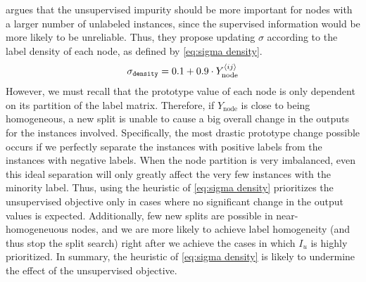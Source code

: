 

 argues that the unsupervised impurity should be more important for nodes with a larger number of unlabeled instances, since the supervised information would be more likely to be unreliable. Thus, they propose updating $\sigma$ according to the label density of each node, as defined by \autoref{eq:sigma density}.
%
\begin{equation}
    \sigma_\texttt{density} = 0.1 + 0.9 \cdot Y_\text{node}^{\langle ij \rangle}
    \label{eq:sigma density}
\end{equation}
%
However, we must recall that the prototype value of each node is only dependent on its partition of the label matrix. Therefore, if $Y_\text{node}$ is close to being homogeneous, a new split is unable to cause a big overall change in the outputs for the instances involved. Specifically, the most drastic prototype change possible occurs if we perfectly separate the instances with positive labels from the instances with negative labels.
When the node partition is very imbalanced, even this ideal separation will only greatly affect the very few instances with the minority label. Thus, using the heuristic of \autoref{eq:sigma density} prioritizes the unsupervised objective only in cases where no significant change in the output values is expected. Additionally, few new splits are possible in near-homogeneuous nodes, and we are more likely to achieve label homogeneity (and thus stop the split search) right after we achieve the cases in which $I_u$ is highly prioritized. In summary, the heuristic of \autoref{eq:sigma density} is likely to undermine the effect of the unsupervised objective.


